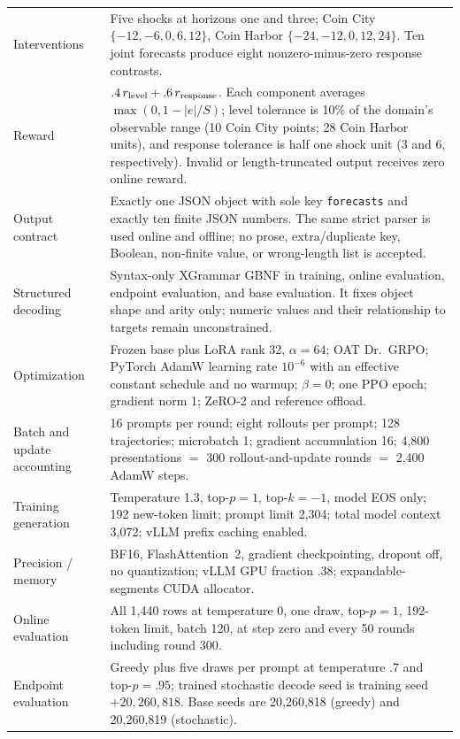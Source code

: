 \begin{center}
\begin{minipage}{\linewidth}
\begin{tabular}{p{.29\linewidth}p{.66\linewidth}}
Interventions & Five shocks at horizons one and three; Coin City
$\{-12,-6,0,6,12\}$, Coin Harbor $\{-24,-12,0,12,24\}$. Ten joint forecasts
produce eight nonzero-minus-zero response contrasts. \\
Reward & $.4\,r_{\rm level}+.6\,r_{\rm response}$. Each component averages
$\max(0,1-|e|/S)$; level tolerance is 10\% of the domain's observable range
(10 Coin City points; 28 Coin Harbor units), and response tolerance is half one
shock unit (3 and 6, respectively). Invalid or length-truncated output receives
zero online reward. \\
Output contract & Exactly one JSON object with sole key
\texttt{forecasts} and exactly ten finite JSON numbers. The same strict parser
is used online and offline; no prose, extra/duplicate key, Boolean, non-finite
value, or wrong-length list is accepted. \\
Structured decoding & Syntax-only XGrammar GBNF in training, online evaluation,
endpoint evaluation, and base evaluation. It fixes object shape and arity only;
numeric values and their relationship to targets remain unconstrained. \\
Optimization & Frozen base plus LoRA rank 32, $\alpha=64$; OAT Dr.~GRPO;
PyTorch AdamW learning rate $10^{-6}$ with an effective constant schedule and no
warmup; $\beta=0$; one PPO epoch; gradient norm 1; ZeRO-2 and reference offload. \\
Batch and update accounting & 16 prompts per round; eight rollouts per prompt;
128 trajectories; microbatch 1; gradient accumulation 16; 4,800 presentations
$=$ 300 rollout-and-update rounds $=$ 2,400 AdamW steps. \\
Training generation & Temperature 1.3, top-$p=1$, top-$k=-1$, model EOS only;
192 new-token limit; prompt limit 2,304; total model context 3,072; vLLM prefix
caching enabled. \\
Precision / memory & BF16, FlashAttention~2, gradient checkpointing, dropout
off, no quantization; vLLM GPU fraction .38; expandable-segments CUDA allocator. \\
Online evaluation & All 1,440 rows at temperature 0, one draw, top-$p=1$,
192-token limit, batch 120, at step zero and every 50 rounds including round 300. \\
Endpoint evaluation & Greedy plus five draws per prompt at temperature .7 and
top-$p=.95$; trained stochastic decode seed is training seed $+20{,}260{,}818$.
Base seeds are 20,260,818 (greedy) and 20,260,819 (stochastic). \\

\end{tabular}
\end{minipage}
\end{center}
